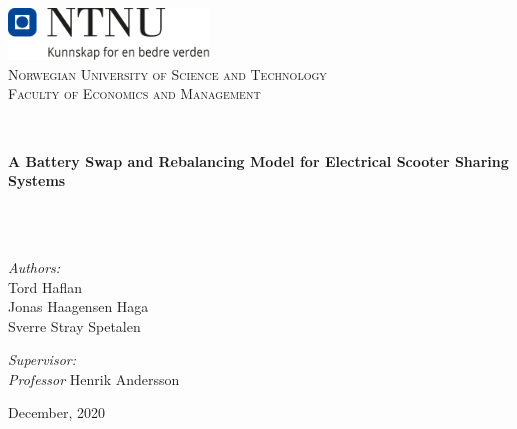 
\begin{titlepage}
\vbox{ }
\vbox{ }
\begin{center}
\includegraphics[width=0.40\textwidth]{Images/NTNU_logo.png}\\[1cm]
\textsc{\Large Norwegian University of Science and Technology}\\[1cm]
\textsc{\Large Faculty of Economics and Management}\\[0.5cm]
\vbox{ }

\linespread{1.0}
\HRule \\[0.4cm]
{ \huge \bfseries A Battery Swap and Rebalancing Model for Electrical Scooter Sharing Systems\par}\\[0.4cm]
\HRule \\[1.5cm]

\begin{multicols}{2}
\linespread{1.6}
\large
\emph{Authors:}\\
Tord Haflan \\
Jonas Haagensen Haga \\
Sverre Stray Spetalen 

\columnbreak


\large
\emph{Supervisor:}\\
\textit{Professor} Henrik Andersson


\end{multicols}

\vfill


{\large December, 2020}
\end{center}
\end{titlepage}